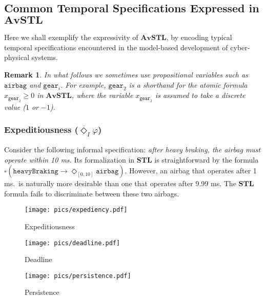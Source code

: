 \documentclass[envcountsect,orivec]{llncs} \usepackage{etex} \usepackage[]{graphicx}
\newtheorem{myremark}[mytheorem]{Remark}
\newcommand{\STL}{\textbf{STL}}
\newcommand{\DiaOp}[1]{\Diamond_{#1}}
\newcommand{\BoxOp}[1]{\square_{#1}}
\newcommand{\TDiaOp}[1]{\overline{\Diamond}_{#1}}
\newcommand{\AvSTL}{\textbf{AvSTL}}
\begin{document}
\subsection{Common Temporal Specifications Expressed in $\AvSTL$}\label{subsec:examplesExpressivity}
Here we shall exemplify the expressivity of $\AvSTL$, by encoding 
typical temporal specifications  encountered in the model-based
development of cyber-physical systems.

\begin{myremark}\label{rem:propVar}
 In what follows we sometimes use \emph{propositional variables} such as
 $\mathtt{airbag}$
 and $\mathtt{gear}_{i}$. For example,  $\mathtt{gear}_{2}$
 is a shorthand for the atomic formula $x_{\mathtt{gear}_{2}} \ge 0$ in $\AvSTL$, where
 the variable $x_{\mathtt{gear}_{2}}$ is assumed to take a discrete value
 ($1$ or $-1$).
\end{myremark}




\subsubsection{Expeditiousness ($\TDiaOp{I}\varphi$)}
Consider the following informal specification: 
\emph{after heavy braking,
  the airbag must operate
  within 10 ms.} 
Its formalization in $\STL$ is straightforward by the formula 
\begin{math}
  \BoxOp{} (
  \mathtt{heavyBraking} \to 
\DiaOp{[0,10]}\mathtt{airbag} )
\end{math}. 
However, an airbag that operates
after 1 ms.\ is naturally more desirable than one that operates
after 9.99 ms. The $\STL$ formula fails to discriminate between these
two airbags.


\begin{figure}[tbp]
\begin{minipage}{.33\textwidth}
        \texttt{[image: pics/expediency.pdf]}

    \vspace{-3.5em}
      \caption{Expeditiousness}
  \label{fig:expeditiousness}
   \end{minipage}
   \begin{minipage}{.33\textwidth}
        \texttt{[image: pics/deadline.pdf]}

        \vspace{-3.5em}
      \caption{Deadline}
  \label{fig:deadline}
   \end{minipage}
    \begin{minipage}{.33\textwidth}
        \texttt{[image: pics/persistence.pdf]}

         \vspace{-3.5em}
      \caption{Persistence}
  \label{fig:persistence}
   \end{minipage}
\end{figure}
\end{document}
